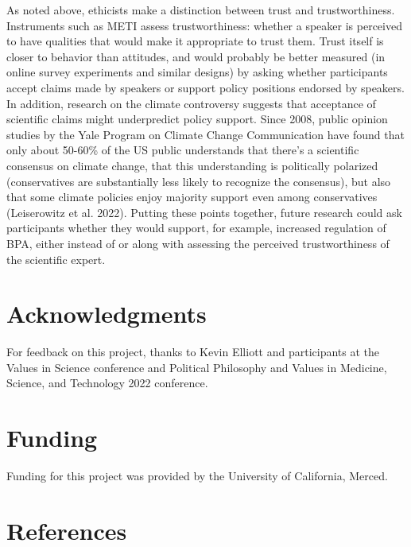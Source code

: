 \documentclass[
  letterpaper,
  DIV=11,
  numbers=noendperiod]{scrartcl}
\begin{document}
As noted above, ethicists make a distinction between trust and
trustworthiness. Instruments such as METI assess trustworthiness:
whether a speaker is perceived to have qualities that would make it
appropriate to trust them. Trust itself is closer to behavior than
attitudes, and would probably be better measured (in online survey
experiments and similar designs) by asking whether participants accept
claims made by speakers or support policy positions endorsed by
speakers. In addition, research on the climate controversy suggests that
acceptance of scientific claims might underpredict policy support. Since
2008, public opinion studies by the Yale Program on Climate Change
Communication have found that only about 50-60\% of the US public
understands that there's a scientific consensus on climate change, that
this understanding is politically polarized (conservatives are
substantially less likely to recognize the consensus), but also that
some climate policies enjoy majority support even among conservatives
(Leiserowitz et al. 2022). Putting these points together, future
research could ask participants whether they would support, for example,
increased regulation of BPA, either instead of or along with assessing
the perceived trustworthiness of the scientific expert.

\hypertarget{acknowledgments}{%
\section{Acknowledgments}\label{acknowledgments}}

For feedback on this project, thanks to Kevin Elliott and participants
at the Values in Science conference and Political Philosophy and Values
in Medicine, Science, and Technology 2022 conference.

\hypertarget{funding}{%
\section{Funding}\label{funding}}

Funding for this project was provided by the University of California,
Merced.

\hypertarget{references}{%
\section*{References}\label{references}}
\end{document}
